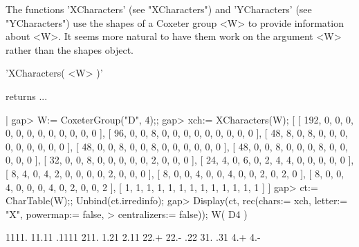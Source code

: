 
The  functions 'XCharacters' (see  "XCharacters") and  'YCharacters' (see
"YCharacters")  use  the  shapes  of  a  Coxeter  group  <W>  to  provide
information about  <W>.  It seems more  natural to have them  work on the
argument <W> rather than the shapes object.


'XCharacters( <W> )'

returns  ...

    
    

|    gap> W:= CoxeterGroup("D", 4);;
    gap> xch:= XCharacters(W);                     
    [ [ 192, 0, 0, 0, 0, 0, 0, 0, 0, 0, 0, 0, 0 ], 
      [ 96, 0, 0, 8, 0, 0, 0, 0, 0, 0, 0, 0, 0 ], 
      [ 48, 8, 0, 8, 0, 0, 0, 0, 0, 0, 0, 0, 0 ], 
      [ 48, 0, 0, 8, 0, 0, 8, 0, 0, 0, 0, 0, 0 ], 
      [ 48, 0, 0, 8, 0, 0, 0, 8, 0, 0, 0, 0, 0 ], 
      [ 32, 0, 0, 8, 0, 0, 0, 0, 0, 2, 0, 0, 0 ], 
      [ 24, 4, 0, 6, 0, 2, 4, 4, 0, 0, 0, 0, 0 ], 
      [ 8, 4, 0, 4, 2, 0, 0, 0, 0, 2, 0, 0, 0 ], 
      [ 8, 0, 0, 4, 0, 0, 4, 0, 0, 2, 0, 2, 0 ], 
      [ 8, 0, 0, 4, 0, 0, 0, 4, 0, 2, 0, 0, 2 ], 
      [ 1, 1, 1, 1, 1, 1, 1, 1, 1, 1, 1, 1, 1 ] ]
    gap> ct:= CharTable(W);;  Unbind(ct.irredinfo);
    gap> Display(ct, rec(chars:= xch, letter:= "X", powermap:= false,        
    >                    centralizers:= false));
    W( D4 )
    
            1111. 11.11 .1111 211. 1.21 2.11 22.+ 22.- .22 31. .31 4.+ 4.-
    
